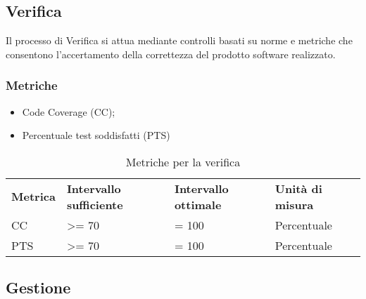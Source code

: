 \subsection{Verifica}
Il processo di Verifica si attua mediante controlli basati su norme e metriche che consentono l'accertamento della correttezza del prodotto software realizzato.
\subsubsection{Metriche}
\begin{itemize}
	\item Code Coverage (CC);
	\item Percentuale test soddisfatti (PTS)
\end{itemize}

\renewcommand{\arraystretch}{2.2}
\begin{longtable}{|C{2.5cm}|C{3.25cm}|C{3.25cm}|C{3cm}|}

	\caption{Metriche per la verifica}\\
	\hline

	\textbf{Metrica} & \textbf{Intervallo sufficiente}  & \textbf{Intervallo ottimale} & \textbf{Unità di misura}
	\tabularnewline
	\endfirsthead

	CC & >= 70  & = 100 & Percentuale \\
	PTS & >= 70 & = 100 & Percentuale \\

\end{longtable}


\subsection{Gestione}
